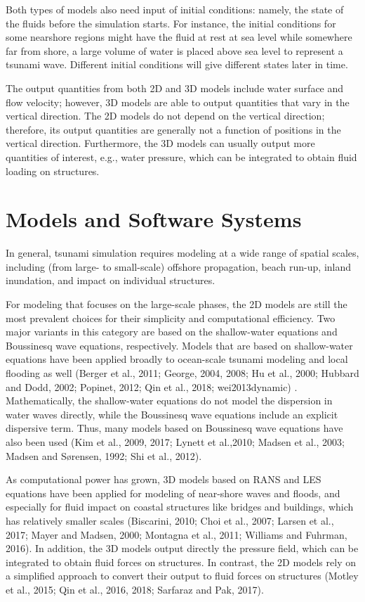Both types of models also need input of initial conditions: namely, the state of the fluids before the simulation starts. For instance, the initial conditions for some nearshore regions might have the fluid at rest at sea level while somewhere far from shore, a large volume of water is placed above sea level to represent a tsunami wave. Different initial conditions will give different states later in time.

The output quantities from both 2D and 3D models include water surface and flow velocity; however, 3D models are able to output quantities that vary in the vertical direction. The 2D models do not depend on the vertical direction; therefore, its output quantities are generally not a function of positions in the vertical direction. Furthermore, the 3D models can usually output more quantities of interest, e.g., water pressure, which can be integrated to obtain fluid loading on structures.

\section{Models and Software Systems}
\label{sec:tsunami_tools}

In general, tsunami simulation requires modeling at a wide range of spatial scales, including (from large- to small-scale) offshore propagation, beach run-up, inland inundation, and impact on individual structures.

For modeling that focuses on the large-scale phases, the 2D models are still the most prevalent choices for their simplicity and computational efficiency. Two major variants in this category are based on the shallow-water equations and Boussinesq wave equations, respectively. Models that are based on shallow-water equations have been applied broadly to ocean-scale tsunami modeling and local flooding as well (Berger et al., 2011; George, 2004, 2008; Hu et al., 2000; Hubbard and Dodd, 2002; Popinet, 2012; Qin et al., 2018; wei2013dynamic) . Mathematically, the shallow-water equations do not model the dispersion in water waves directly, while the Boussinesq wave equations include an explicit dispersive term. Thus, many models based on Boussinesq wave equations have also been used (Kim et al., 2009, 2017; Lynett et al.,2010; Madsen et al., 2003; Madsen and Sørensen, 1992; Shi et al., 2012). 

As computational power has grown, 3D models based on RANS and LES equations have been applied for modeling of near-shore waves and floods, and especially for fluid impact on coastal structures like bridges and buildings, which has relatively smaller scales (Biscarini, 2010; Choi et al., 2007; Larsen et al., 2017; Mayer and Madsen, 2000; Montagna et al., 2011; Williams and Fuhrman, 2016). In addition, the 3D models output directly the pressure field, which can be integrated to obtain fluid forces on structures. In contrast, the 2D models rely on a simplified approach to convert their output to fluid forces on structures (Motley et al., 2015; Qin et al., 2016, 2018; Sarfaraz and Pak, 2017). 


